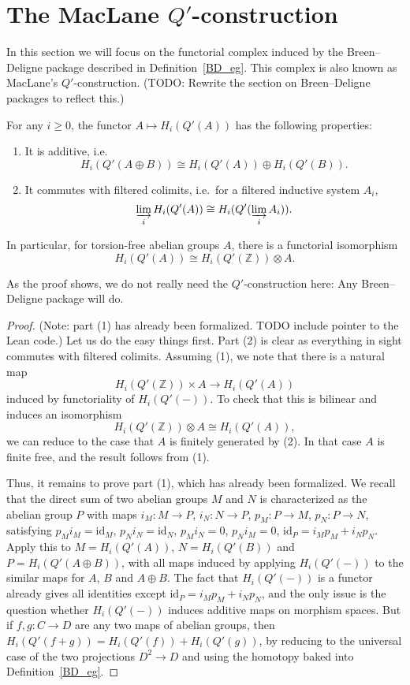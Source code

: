 \section{The MacLane $Q'$-construction}

In this section we will focus on the functorial complex induced by the Breen--Deligne package
described in Definition~\ref{BD_eg}.
This complex is also known as MacLane's $Q'$-construction.
(TODO: Rewrite the section on Breen--Deligne packages to reflect this.)

\begin{proposition}
  \label{homology-Qprime}
  For any $i\geq 0$, the functor $A\mapsto H_i(Q'(A))$ has the following properties:
  \begin{enumerate}
    \item It is additive, i.e.
      \[ H_i(Q'(A\oplus B))\cong H_i(Q'(A))\oplus H_i(Q'(B)).  \]
    \item It commutes with filtered colimits, i.e.~for a filtered inductive system $A_i$,
      \[ \varinjlim_i H_i(Q'(A))\cong H_i(Q'(\varinjlim_i A_i)). \]
  \end{enumerate}

  In particular, for torsion-free abelian groups $A$, there is a functorial isomorphism
  \[ H_i(Q'(A))\cong H_i(Q'(\mathbb Z))\otimes A.  \]
\end{proposition}

As the proof shows, we do not really need the $Q'$-construction here: Any Breen--Deligne package will do.

\begin{proof}
  (Note: part (1) has already been formalized. TODO include pointer to the Lean code.)
  Let us do the easy things first. Part (2) is clear as everything in sight commutes with filtered colimits.
  Assuming (1), we note that there is a natural map
  \[ H_i(Q'(\mathbb Z))\times A\to H_i(Q'(A)) \]
  induced by functoriality of $H_i(Q'(-))$. To check that this is bilinear and induces an isomorphism
  \[ H_i(Q'(\mathbb Z))\otimes A\cong H_i(Q'(A)), \]
  we can reduce to the case that $A$ is finitely generated by (2).
  In that case $A$ is finite free, and the result follows from (1).

  Thus, it remains to prove part (1), which has already been formalized.
  We recall that the direct sum of two abelian groups $M$ and $N$
  is characterized as the abelian group $P$ with maps $i_M: M\to P$, $i_N: N\to P$, $p_M: P\to M$, $p_N: P\to N$,
  satisfying $p_M i_M=\mathrm{id}_M$, $p_N i_N = \mathrm{id}_N$, $p_M i_N=0$, $p_N i_M = 0$, $\mathrm{id}_P = i_M p_M + i_N p_N$.
  Apply this to $M=H_i(Q'(A))$, $N=H_i(Q'(B))$ and $P=H_i(Q'(A\oplus B))$,
  with all maps induced by applying $H_i(Q'(-))$ to the similar maps for $A$, $B$ and $A\oplus B$.
  The fact that $H_i(Q'(-))$ is a functor already gives all identities except $\mathrm{id}_P = i_M p_M + i_N p_N$,
  and the only issue is the question whether $H_i(Q'(-))$ induces additive maps on morphism spaces.
  But if $f,g: C\to D$ are any two maps of abelian groups, then $H_i(Q'(f+g)) = H_i(Q'(f))+H_i(Q'(g))$,
  by reducing to the universal case of the two projections $D^2\to D$ and using the homotopy baked into Definition~\ref{BD_eg}.
\end{proof}

